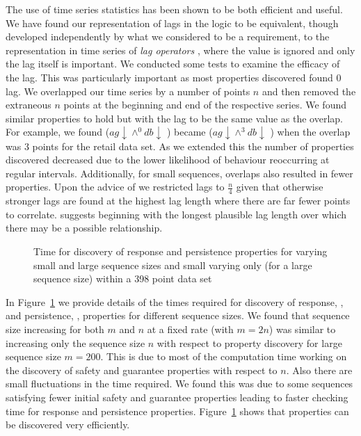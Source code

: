 The use of time series statistics has been shown to be both efficient and
useful. We have found our representation of lags in the logic to be
equivalent, though developed independently by what we considered to be a requirement, to the representation in time series of {\em lag
operators} \cite{end95}, where the value is ignored and only the lag
itself is important. We conducted some tests to examine the efficacy
of the lag. This was particularly important as most properties
discovered found 0 lag. We overlapped our time series by a number of
points $n$ and then removed the extraneous $n$ points at the beginning
and end of the respective series. We found similar properties to hold
but with the lag to be the same value as the overlap. For example, we
found  ($ag \downarrow \wedge^{0} db \downarrow$ ) became
 ($ag \downarrow \wedge^{3} db \downarrow$ ) when the overlap
was 3 points for the retail data set. As we extended
this the number of properties discovered decreased due to the lower
likelihood of behaviour reoccurring at regular intervals. Additionally,
for small sequences, overlaps also resulted in fewer properties. Upon
the advice of \cite{ko90} we restricted lags to $\frac{n}{4}$ given
that otherwise stronger lags are found at the highest lag length where
there are far fewer points to correlate.  \cite{end95} suggests
beginning with the longest plausible lag length over which there may
be a possible relationship. 


\begin{figure}
\centerline{}
\caption{\label{graph:prop_disc_time}{Time for discovery of
response and persistence properties for varying small and large
sequence sizes and small varying only (for a large sequence size)
within a 398 point data set}}
\end{figure}

In Figure~\ref{graph:prop_disc_time} we provide details of the times
required for discovery of response, , and persistence, ,
properties for different sequence 
sizes. We found that sequence size increasing for both $m$ and $n$ at
a fixed rate (with $m = 2n$) was
similar to increasing only the sequence size $n$ with respect to
property discovery for large sequence size $m = 200$. This is due to
most of the computation 
time working on the discovery of safety and guarantee properties with
respect to $n$. Also there are small fluctuations in the time
required. We found this was due to some sequences satisfying fewer
initial safety and guarantee properties leading to faster checking
time for response and persistence
properties. Figure~\ref{graph:prop_disc_time} shows that properties
can be discovered very efficiently.


